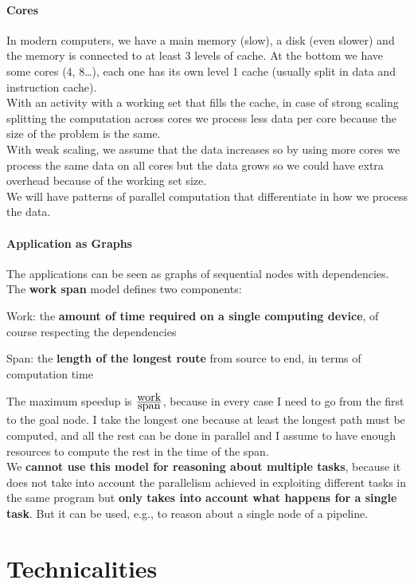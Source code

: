 \documentclass[10pt]{report}
\begin{document}
\paragraph{Cores} In modern computers, we have a main memory (slow), a disk (even slower) and the memory is connected to at least 3 levels of cache. At the bottom we have some cores (4, 8\ldots), each one has its own level 1 cache (usually split in data and instruction cache).\\
With an activity with a working set that fills the cache, in case of strong scaling splitting the computation across cores we process less data per core because the size of the problem is the same.\\
With weak scaling, we assume that the data increases so by using more cores we process the same data on all cores but the data grows so we could have extra overhead because of the working set size.\\
We will have patterns of parallel computation that differentiate in how we process the data.
\paragraph{Application as Graphs} The applications can be seen as graphs of sequential nodes with dependencies. The \textbf{work span} model defines two components:
\begin{list}{}{}
	\item Work: the \textbf{amount of time required on a single computing device}, of course respecting the dependencies
	\item Span: the \textbf{length of the longest route} from source to end, in terms of computation time
\end{list}
The maximum speedup is $\frac{\hbox{work}}{\hbox{span}}$, because in every case I need to go from the first to the goal node. I take the longest one because at least the longest path must be computed, and all the rest can be done in parallel and I assume to have enough resources to compute the rest in the time of the span.\\
We \textbf{cannot use this model for reasoning about multiple tasks}, because it does not take into account the parallelism achieved in exploiting different tasks in the same program but \textbf{only takes into account what happens for a single task}. But it can be used, e.g., to reason about a single node of a pipeline.
\section{Technicalities}
\end{document}
